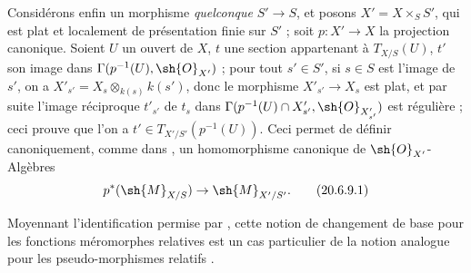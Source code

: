 \begin{env}[20.6.9]
\label{IV.20.6.9}
Considérons enfin un morphisme \emph{quelconque} $S'\to S$, et posons $X'=X\times_S S'$, qui est plat et localement de présentation finie sur $S'$ ; soit $p:X'\to X$ la projection canonique.
Soient $U$ un ouvert de $X$, $t$ une section appartenant à $T_{X/S}(U)$, $t'$ son image dans $\Gamma(p^{-1}(U),\sh{O}_{X'})$ ; pour tout $s'\in S'$, si $s\in S$ est l'image de $s'$, on a $X'_{s'}=X_s\otimes_{k(s)}k(s')$, donc le morphisme $X'_{s'}\to X_s$ est plat, et par suite  l'image réciproque $t'_{s'}$ de $t_s$ dans $\Gamma(p^{-1}(U)\cap X'_{s'},\sh{O}_{X'_{s'}})$ est régulière ; ceci prouve que l'on a $t'\in T_{X'/S'}(p^{-1}(U))$.
Ceci permet de définir canoniquement, comme dans , un homomorphisme canonique de $\sh{O}_{X'}$-Algèbres
\[
\label{IV.20.6.9.1}
  p^*(\sh{M}_{X/S})\to\sh{M}_{X'/S'}.
  \tag{20.6.9.1}
\]

Moyennant l'identification permise par , cette notion de changement de base pour les fonctions méromorphes relatives est un cas particulier de la notion analogue pour les pseudo-morphismes relatifs .
\end{env}
